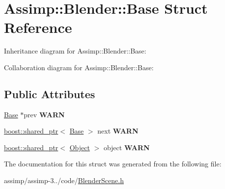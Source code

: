 \hypertarget{struct_assimp_1_1_blender_1_1_base}{\section{Assimp\+:\+:Blender\+:\+:Base Struct Reference}
\label{struct_assimp_1_1_blender_1_1_base}
}


Inheritance diagram for Assimp\+:\+:Blender\+:\+:Base\+:


Collaboration diagram for Assimp\+:\+:Blender\+:\+:Base\+:
\subsection*{Public Attributes}
\begin{DoxyCompactItemize}
\item 
\hypertarget{struct_assimp_1_1_blender_1_1_base_aa81c58cb0077626c4a5ddc92f93040ab}{\hyperlink{struct_assimp_1_1_blender_1_1_base}{Base} $\ast$prev {\bfseries W\+A\+R\+N}}\label{struct_assimp_1_1_blender_1_1_base_aa81c58cb0077626c4a5ddc92f93040ab}

\item 
\hypertarget{struct_assimp_1_1_blender_1_1_base_a9618d0560c48adcf1f82f48eda5b24fe}{\hyperlink{classboost_1_1shared__ptr}{boost\+::shared\+\_\+ptr}$<$ \hyperlink{struct_assimp_1_1_blender_1_1_base}{Base} $>$ next {\bfseries W\+A\+R\+N}}\label{struct_assimp_1_1_blender_1_1_base_a9618d0560c48adcf1f82f48eda5b24fe}

\item 
\hypertarget{struct_assimp_1_1_blender_1_1_base_a683d0d18dfada6cf349edb9e62811465}{\hyperlink{classboost_1_1shared__ptr}{boost\+::shared\+\_\+ptr}$<$ \hyperlink{struct_assimp_1_1_blender_1_1_object}{Object} $>$ object {\bfseries W\+A\+R\+N}}\label{struct_assimp_1_1_blender_1_1_base_a683d0d18dfada6cf349edb9e62811465}

\end{DoxyCompactItemize}


The documentation for this struct was generated from the following file\+:\begin{DoxyCompactItemize}
\item 
assimp/assimp-\/3../code/\hyperlink{_blender_scene_8h}{Blender\+Scene.\+h}\end{DoxyCompactItemize}
